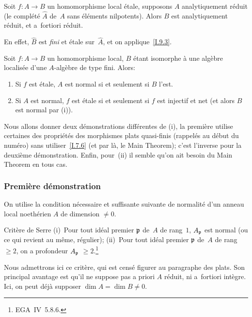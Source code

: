 \begin{corollaire}
\label{I.9.4}
Soit $f\colon A\to B$ un homomorphisme local \'etale, supposons $A$
analytiquement r\'eduit
(\ie le compl\'et\'e $\hat{A}$ de~$A$ sans \'el\'ements
nilpotents). Alors $B$ est analytiquement r\'eduit, et a~fortiori
r\'eduit.
\end{corollaire}

En effet,
$\hat{B}$
est \emph{fini} et \'etale sur~$\hat{A}$, et on applique~\ref{I.9.3}.

\begin{theoreme}
\label{I.9.5}
Soit $f\colon A\to B$ un homomorphisme local, $B$ \'etant isomorphe
\`a une alg\`ebre localis\'ee d'une $A$-alg\`ebre de type
fini. Alors:
\begin{enumerate}
\item[(i)] Si $f$ est \'etale, $A$ est normal si et seulement si $B$
l'est.
\item[(ii)] Si $A$ est normal, $f$ est \'etale si et seulement si
$f$ est injectif et net (et alors $B$ est normal par \textup{(i)}).
\end{enumerate}
\end{theoreme}

Nous allons donner deux d\'emonstrations diff\'erentes de (i), la
premi\`ere utilise certaines des propri\'et\'es des morphismes
plats quasi-finis (rappel\'es au d\'ebut du num\'ero) sans
utiliser~\ref{I.7.6} (et par l\`a, le Main Theorem); c'est l'inverse pour la
deuxi\`eme d\'emonstration. Enfin, pour~(ii) il semble qu'on ait
besoin du Main Theorem en tous cas.

\subsubsection*{Premi\`ere d\'emonstration}
On utilise la condition n\'ecessaire et suffisante suivante
de normalit\'e d'un anneau local noeth\'erien $A$ de dimension
$\neq0$.

\begin{enonce*}{Crit\`ere de Serre}
\textup{(i)}~Pour tout id\'eal premier $\mathfrak{p}$ de~$A$ de rang~$1$,
$A_{\mathfrak{p}}$ est normal (ou ce qui revient au m\^eme,
r\'egulier); \textup{(ii)}~Pour tout id\'eal premier $\mathfrak{p}$ de~$A$ de
rang~$\geq 2$, on a profondeur $A_{\mathfrak{p}}$ $\geq2$.\footnote{\Cf EGA~IV~5.8.6.}
\end{enonce*}

Nous admettrons ici ce crit\`ere, qui est cens\'e figurer au
paragraphe
des plats. Son principal avantage est qu'il ne suppose pas a priori
$A$ r\'eduit, ni a~fortiori int\`egre. Ici, on peut d\'ej\`a
supposer $\dim{A}=\dim{B}\neq0$.

